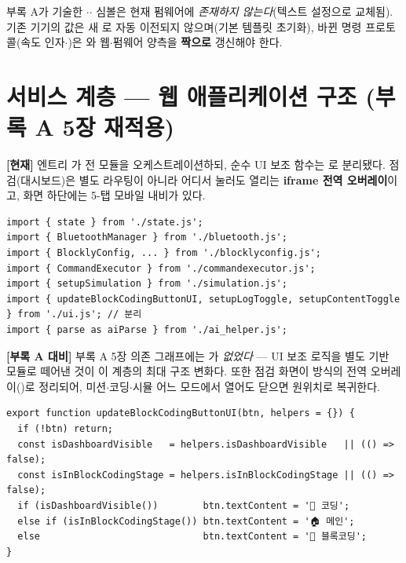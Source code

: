 \begin{notebox}[주의 --- 설정 이전 · 계약 문서]
\small
부록 A가 기술한 $\cdot$$\cdot$ 심볼은
현재 펌웨어에 \emph{존재하지 않는다}(텍스트 설정으로 교체됨). 기존 기기의 
값은 새 로 자동 이전되지 않으며(기본 템플릿 초기화), 바뀐 명령
프로토콜(속도 인자$\cdot$)은 와 웹$\cdot$펌웨어 양측을
\textbf{짝으로} 갱신해야 한다.
\end{notebox}

\section{서비스 계층 --- 웹 애플리케이션 구조 (부록 A 5장 재적용)}
\textbf{[현재]} 엔트리 가 전 모듈을 오케스트레이션하되, 순수 UI 보조 함수는
\textbf{}로 분리됐다. 점검(대시보드)은 별도 라우팅이 아니라 어디서 눌러도 열리는
\textbf{iframe 전역 오버레이}이고, 화면 하단에는 5-탭 모바일 내비가 있다.

\begin{verbatim}
import { state } from './state.js';
import { BluetoothManager } from './bluetooth.js';
import { BlocklyConfig, ... } from './blocklyconfig.js';
import { CommandExecutor } from './commandexecutor.js';
import { setupSimulation } from './simulation.js';
import { updateBlockCodingButtonUI, setupLogToggle, setupContentToggle } from './ui.js'; // 분리
import { parse as aiParse } from './ai_helper.js';
\end{verbatim}

\smallskip
\noindent\textbf{[부록 A 대비]} 부록 A 5장 의존 그래프에는 가 \emph{없었다} ---
UI 보조 로직을 별도 기반 모듈로 떼어낸 것이 이 계층의 최대 구조 변화다. 또한 점검 화면이
 방식의 전역 오버레이()로 정리되어, 미션$\cdot$코딩$\cdot$시뮬 어느 모드에서 열어도 닫으면 원위치로
복귀한다.

\begin{verbatim}
export function updateBlockCodingButtonUI(btn, helpers = {}) {
  if (!btn) return;
  const isDashboardVisible   = helpers.isDashboardVisible   || (() => false);
  const isInBlockCodingStage = helpers.isInBlockCodingStage || (() => false);
  if (isDashboardVisible())        btn.textContent = '🧩 코딩';
  else if (isInBlockCodingStage()) btn.textContent = '🏠 메인';
  else                             btn.textContent = '🧩 블록코딩';
}
\end{verbatim}

